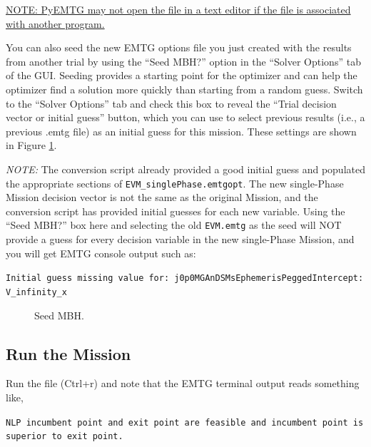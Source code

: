\documentclass[11pt]{article}
\makeatletter
\newcommand{\knownissuelabel}[2]
{
	 \phantomsection
  	\hyperref[#2_h]{#1}\def\@currentlabel{\unexpanded{#1}}\label{#2_b}
}
\makeatother
\begin{document}
\noindent \knownissuelabel{NOTE: PyEMTG may not open the file in a text editor if the file is associated with another program.}{text_editor_issue}

\noindent You can also seed the new \ac{EMTG} options file you just created with the results from another trial by using the ``Seed MBH?'' option in the ``Solver Options'' tab of the \acs{GUI}. Seeding provides a starting point for the optimizer and can help the optimizer find a solution more quickly than starting from a random guess. Switch to the ``Solver Options'' tab and check this box to reveal the ``Trial decision vector or initial guess'' button, which you can use to select previous results (i.e., a previous .emtg file) as an initial guess for this mission. These settings are shown in Figure \ref{fig:seed_mbh}.
 
\noindent \textit{NOTE:} The conversion script already provided a good initial guess and populated the appropriate sections of \texttt{EVM\_singlePhase.emtgopt}. The new single-Phase Mission decision vector is not the same as the original Mission, and the conversion script has provided initial guesses for each new variable. Using the ``Seed MBH?'' box here and selecting the old \texttt{EVM.emtg} as the seed will NOT provide a guess for every decision variable in the new single-Phase Mission, and you will get \ac{EMTG} console output such as:

\noindent \texttt{Initial guess missing value for: j0p0MGAnDSMsEphemerisPeggedIntercept: V\_infinity\_x}

\begin{figure}
	\centering
	\caption{\label{fig:seed_mbh}Seed \acs{MBH}.}
\end{figure}

\subsection{Run the Mission}
\label{sec:run_the_mission_single_phase}

Run the file (Ctrl+r) and note that the \ac{EMTG} terminal output reads something like,

\noindent \texttt{NLP incumbent point and exit point are feasible and incumbent point is superior to exit point.}
\end{document}
